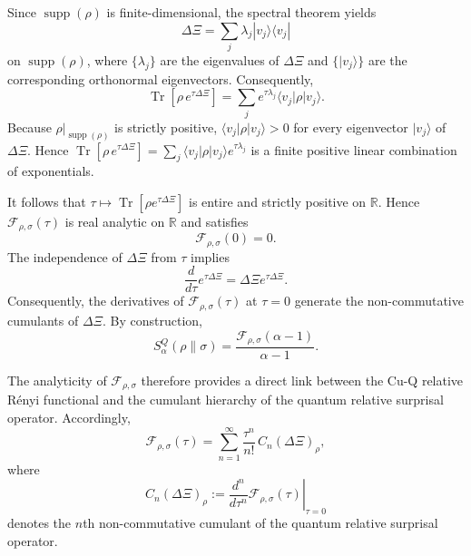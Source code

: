\documentclass[a4paper, amsfonts, amssymb, amsmath, reprint, showkeys, nofootinbib, twoside, aps, pra]{revtex4-2}
\theoremstyle{definition}
\begin{document}
Since $\operatorname{supp}(\rho)$ is finite-dimensional, the spectral theorem yields
\begin{equation}
    \Delta\Xi = \sum_j \lambda_j |v_j\rangle\langle v_j|
\end{equation}
on $\operatorname{supp}(\rho)$, where $\{\lambda_j\}$ are the eigenvalues of $\Delta\Xi$ and $\{|v_j\rangle\}$ are the corresponding orthonormal
eigenvectors. Consequently,
\begin{equation}
    \operatorname{Tr}\!\left[\rho\, e^{\tau\Delta\Xi}\right]
    =
    \sum_j e^{\tau\lambda_j}\langle v_j|\rho|v_j\rangle.
\end{equation}
Because $\rho|_{\operatorname{supp}(\rho)}$ is strictly positive,
$\langle v_j|\rho|v_j\rangle>0$ for every eigenvector $|v_j\rangle$ of
$\Delta\Xi$. Hence
\(
\operatorname{Tr}\!\left[\rho\,e^{\tau\Delta\Xi}\right]
=
\sum_j
\langle v_j|\rho|v_j\rangle e^{\tau\lambda_j}
\)
is a finite positive linear combination of exponentials.

It follows that
$\tau\mapsto\operatorname{Tr}[\rho e^{\tau\Delta\Xi}]$
is entire and strictly positive on $\mathbb R$.
Hence $\mathcal F_{\rho,\sigma}(\tau)$
is real analytic on $\mathbb R$
and satisfies
\[
\mathcal F_{\rho,\sigma}(0)=0.
\]
The independence of $\Delta\Xi$ from $\tau$ implies
\begin{equation}
    \frac{d}{d\tau}e^{\tau\Delta\Xi}
    =
    \Delta\Xi e^{\tau\Delta\Xi}.
\end{equation}
Consequently, the derivatives of
$\mathcal F_{\rho,\sigma}(\tau)$
at $\tau=0$
generate the non-commutative cumulants of
$\Delta\Xi$.
By construction,
\begin{equation}
\label{eq:Sq_from_K}
    S_\alpha^Q(\rho\|\sigma)
    =
    \frac{\mathcal F_{\rho,\sigma}(\alpha-1)}
         {\alpha-1}.
\end{equation}

The analyticity of $\mathcal F_{\rho,\sigma}$ therefore provides a direct link between the Cu-Q relative Rényi functional and the cumulant
hierarchy of the quantum relative surprisal operator. Accordingly,
\begin{equation}
\label{eq:K_expansion}
    \mathcal F_{\rho,\sigma}(\tau)
    =
    \sum_{n=1}^{\infty}
    \frac{\tau^n}{n!}\,
    C_n(\Delta\Xi)_\rho,
\end{equation}
where
\begin{equation}
    C_n(\Delta\Xi)_\rho
    :=
    \left.
    \frac{d^n}{d\tau^n}
    \mathcal F_{\rho,\sigma}(\tau)
    \right|_{\tau=0}
\end{equation}
denotes the $n$th non-commutative cumulant of the quantum relative
surprisal operator. 
\end{document}

